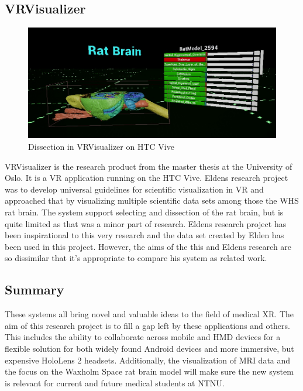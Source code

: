 \subsection*{VRVisualizer}\label{chap:vrvis}
\begin{figure}[H]
    \centering
    \includegraphics[width=\textwidth]{fig/vrvis_ratbrain.jpg}
    \caption{Dissection in VRVisualizer on HTC Vive}
    \label{fig:vrvis}
\end{figure}
VRVisualizer is the research product from the master thesis \citet{Elden2017} at the University of Oslo. It is a VR application running on the HTC Vive. Eldens research project was to develop universal guidelines for scientific visualization in VR and approached that by visualizing multiple scientific data sets among those the WHS rat brain. The system support selecting and dissection of the rat brain, but is quite limited as that was a minor part of research. Eldens research project has been inspirational to this very research and the data set created by Elden has been used in this project. However, the aims of the this and Eldens research are so dissimilar that it's appropriate to compare his system as related work. 

\subsection*{Summary}

These systems all bring novel and valuable ideas to the field of medical XR. The aim of this research project is to fill a gap left by these applications and others. This includes the ability to collaborate across mobile and HMD devices for a flexible solution for both widely found Android devices and more immersive, but expensive HoloLens 2 headsets. Additionally, the visualization of MRI data and the focus on the Waxholm Space rat brain model will make sure the new system is relevant for current and future medical students at NTNU.





